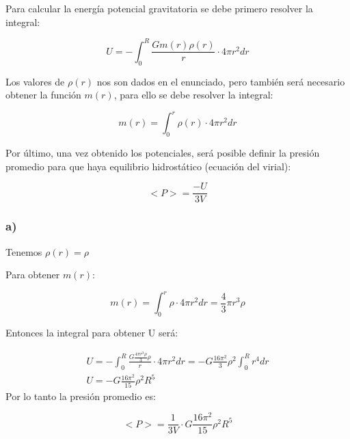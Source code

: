 \documentclass[2pt]{article}
\begin{document}
\section{}

Para calcular la energía potencial gravitatoria se debe primero resolver la integral:

\begin{equation}
U=-\int^R_0 \frac{G m(r)  \rho (r)}{r} \cdot 4 \pi r^2 dr
\end{equation}

Los valores de $\rho (r)$ nos son dados en el enunciado, pero también será necesario obtener la función $m(r)$, para ello se debe resolver la integral:

\begin{equation}
m(r)=\int^r_0 \rho(r)\cdot 4\pi r^2 dr
\end{equation}

Por último, una vez obtenido los potenciales, será posible definir la presión promedio para que haya equilibrio hidrostático (ecuación del virial):

\begin{equation}
<P>=\frac{-U}{3V}
\end{equation}

\subsubsection{a)}

Tenemos $\rho (r) = \rho$

Para obtener $m(r)$:

\begin{equation}
m(r)=\int^r_0 \rho\cdot 4\pi r^2 dr= \frac{4}{3}\pi r^3 \rho
\end{equation}

Entonces la integral para obtener U será:

\begin{subequations}
\begin{align}
		U=-\int^R_0 \frac{G \frac{4\pi r^3 \rho}{3}  \rho}{r} \cdot 4 \pi r^2 dr = -G\frac{16\pi^2}{3} \rho^2 \int^R_0 r^4 dr \\
		U=-G\frac{16\pi^2}{15} \rho^2 R^5
\end{align}
\end{subequations}
 Por lo tanto la presión promedio es:
 
\begin{equation}
<P>=\frac{1}{3V} \cdot G\frac{16\pi^2}{15} \rho^2 R^5
\end{equation}
\end{document}
